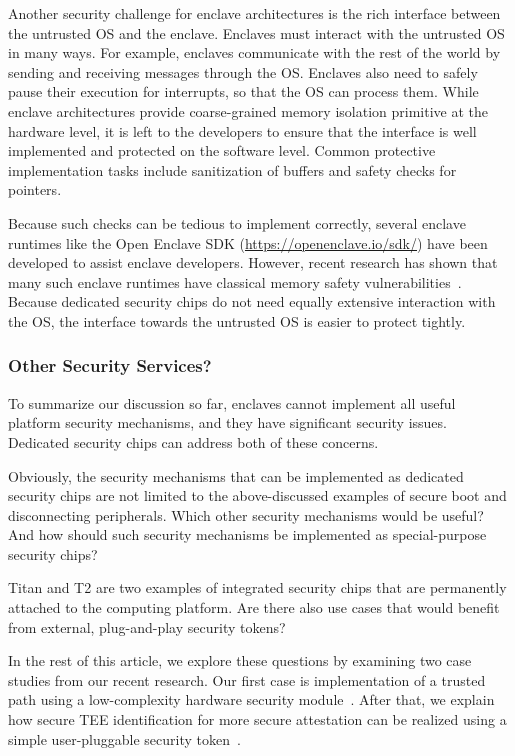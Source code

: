 Another security challenge for enclave architectures is the rich interface between the untrusted OS and the enclave. Enclaves must interact with the untrusted OS in many ways. For example, enclaves communicate with the rest of the world by sending and receiving messages through the OS. Enclaves also need to safely pause their execution for interrupts, so that the OS can process them. While enclave architectures provide coarse-grained memory isolation primitive at the hardware level, it is left to the developers to ensure that the interface is well implemented and protected on the software level. Common protective implementation tasks include sanitization of buffers and safety checks for pointers. 

Because such checks can be tedious to implement correctly, several enclave runtimes like the Open Enclave SDK (\url{https://openenclave.io/sdk/}) have been developed to assist enclave developers. However, recent research has shown that many such enclave runtimes have classical memory safety vulnerabilities~\cite{van2019tale}. Because dedicated security chips do not need equally extensive interaction with the OS, the interface towards the untrusted OS is easier to protect tightly. 


\subsubsection*{Other Security Services?}

To summarize our discussion so far, enclaves cannot implement all useful platform security mechanisms, and they have significant security issues. Dedicated security chips can address both of these concerns. 

Obviously, the security mechanisms that can be implemented as dedicated security chips are not limited to the above-discussed examples of secure boot and disconnecting peripherals. Which other security mechanisms would be useful? And how should such security mechanisms be implemented as special-purpose security chips? 

Titan and T2 are two examples of integrated security chips that are permanently attached to the computing platform. Are there also use cases that would benefit from external, plug-and-play security tokens?

In the rest of this article, we explore these questions by examining two case studies from our recent research. Our first case is implementation of a trusted path using a low-complexity hardware security module~\cite{protection}. After that, we explain how secure TEE identification for more secure attestation can be realized using a simple user-pluggable security token~\cite{proximitee}.
